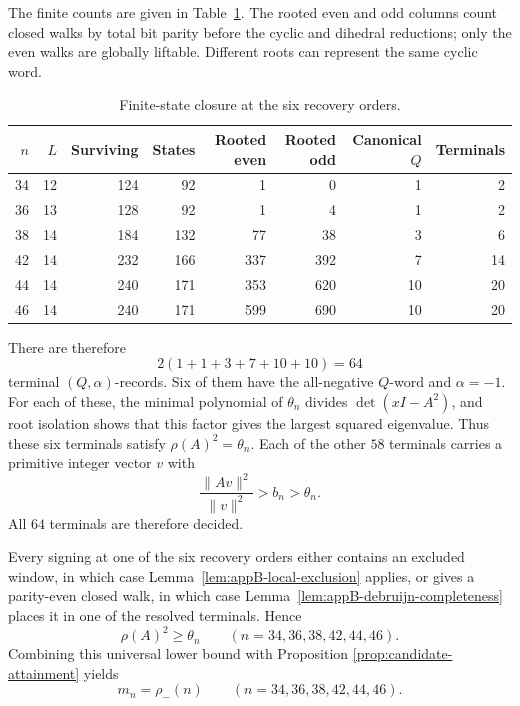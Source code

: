 The finite counts are given in Table~\ref{tab:appB-recovery-orders}.
The rooted even and odd columns count closed walks by total bit parity before
the cyclic and dihedral reductions; only the even walks are globally
liftable.  Different roots can represent the same cyclic word.

\begin{table}[t]
\centering
\caption{Finite-state closure at the six recovery orders.}
\label{tab:appB-recovery-orders}
\small
\setlength{\tabcolsep}{4pt}
\begin{tabular}{@{}r r r r r r r r@{}}
\toprule
\(n\)&\(L\)&Surviving&States&Rooted even&Rooted odd&Canonical \(Q\)&Terminals\\
\midrule
34&12&124&92 &1  &0  &1 &2\\
36&13&128&92 &1  &4  &1 &2\\
38&14&184&132&77 &38 &3 &6\\
42&14&232&166&337&392&7 &14\\
44&14&240&171&353&620&10&20\\
46&14&240&171&599&690&10&20\\
\bottomrule
\end{tabular}
\end{table}

There are therefore
\begin{equation}\label{eq:appB-terminal-total}
 2(1+1+3+7+10+10)=64
\end{equation}
terminal \((Q,\alpha)\)-records.  Six of them have the all-negative
\(Q\)-word and \(\alpha=-1\).  For each of these, the minimal polynomial of
\(\theta_n\) divides \(\det(xI-A^2)\), and root isolation shows that
this factor gives the largest squared eigenvalue.  Thus these six terminals
satisfy \(\rho(A)^2=\theta_n\).  Each of the other \(58\) terminals carries
a primitive integer vector \(v\) with
\[
 \frac{\lVert Av\rVert^2}{\lVert v\rVert^2}>b_n>\theta_n.
\]
All \(64\) terminals are therefore decided.

Every signing at one of the six recovery orders either contains an excluded
window, in which case Lemma~\ref{lem:appB-local-exclusion} applies, or gives
a parity-even closed walk, in which case
Lemma~\ref{lem:appB-debruijn-completeness} places it in one of the resolved
terminals.  Hence
\[
 \rho(A)^2\geq\theta_n
 \qquad(n=34,36,38,42,44,46).
\]
Combining this universal lower bound with Proposition
\ref{prop:candidate-attainment} yields
\begin{equation}\label{eq:appB-recovery-equality}
 m_n=\rho_-(n)
 \qquad(n=34,36,38,42,44,46).
\end{equation}

